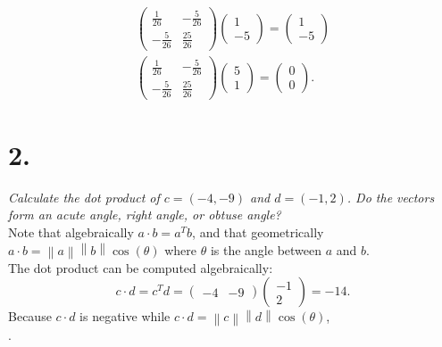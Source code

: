 \documentclass[12pt]{article}
\begin{document}
\begin{gather*}
	\begin{pmatrix}
		\frac{1}{26} & -\frac{5}{26} \\
		-\frac{5}{26} & \frac{25}{26}
	\end{pmatrix}
	\begin{pmatrix} 1 \\ -5 \end{pmatrix}
	=
	\begin{pmatrix} 1 \\ -5 \end{pmatrix}
	\\
	\begin{pmatrix}
		\frac{1}{26} & -\frac{5}{26} \\
		-\frac{5}{26} & \frac{25}{26}
	\end{pmatrix}
	\begin{pmatrix} 5 \\ 1 \end{pmatrix}
	=
	\begin{pmatrix} 0 \\ 0 \end{pmatrix}
	.
\end{gather*}

\section*{2.}
\textit{Calculate the dot product of $c = (-4, -9)$ and $d = (-1, 2)$. Do the
vectors form an acute angle, right angle, or obtuse angle?}\\[\baselineskip]
Note that algebraically $a \cdot b = a^T b$, and that geometrically
$a \cdot b =
\left\lVert a \right\rVert \left\lVert b \right\rVert \cos(\theta)$
where $\theta$ is the angle between
$a$ and $b$.
\\[\baselineskip]
The dot product can be computed algebraically:
\begin{equation*}
	c \cdot d = c^T d
	=
	\begin{pmatrix} -4 & -9 \end{pmatrix}
	\begin{pmatrix} -1 \\ 2 \end{pmatrix}
	=
	\boxed{-14}
	.
\end{equation*}
Because $c \cdot d$ is negative while
$c \cdot d =
\left\lVert c \right\rVert \left\lVert d \right\rVert \cos(\theta)$, \\
.
\end{document}
